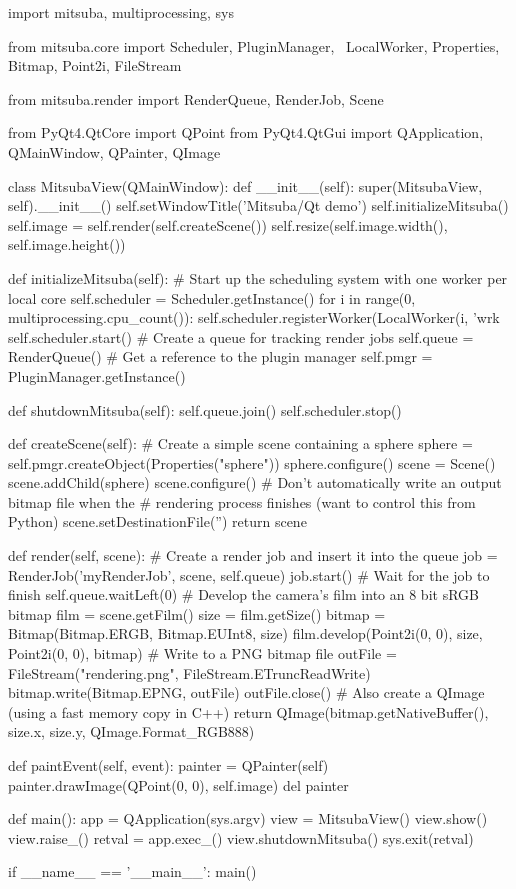\begin{python}
import mitsuba, multiprocessing, sys

from mitsuba.core import Scheduler, PluginManager, \
    LocalWorker, Properties, Bitmap, Point2i, FileStream

from mitsuba.render import RenderQueue, RenderJob, Scene

from PyQt4.QtCore import QPoint
from PyQt4.QtGui import QApplication, QMainWindow, QPainter, QImage

class MitsubaView(QMainWindow):
    def __init__(self):
        super(MitsubaView, self).__init__()
        self.setWindowTitle('Mitsuba/Qt demo')
        self.initializeMitsuba()
        self.image = self.render(self.createScene())
        self.resize(self.image.width(), self.image.height())

    def initializeMitsuba(self):
        # Start up the scheduling system with one worker per local core
        self.scheduler = Scheduler.getInstance()
        for i in range(0, multiprocessing.cpu_count()):
            self.scheduler.registerWorker(LocalWorker(i, 'wrk%
        self.scheduler.start()
        # Create a queue for tracking render jobs
        self.queue = RenderQueue()
        # Get a reference to the plugin manager
        self.pmgr = PluginManager.getInstance()

    def shutdownMitsuba(self):
        self.queue.join()
        self.scheduler.stop()

    def createScene(self):
        # Create a simple scene containing a sphere
        sphere = self.pmgr.createObject(Properties("sphere"))
        sphere.configure()
        scene = Scene()
        scene.addChild(sphere)
        scene.configure()
        # Don't automatically write an output bitmap file when the
        # rendering process finishes (want to control this from Python)
        scene.setDestinationFile('')
        return scene

    def render(self, scene):
        # Create a render job and insert it into the queue
        job = RenderJob('myRenderJob', scene, self.queue)
        job.start()
        # Wait for the job to finish
        self.queue.waitLeft(0)
        # Develop the camera's film into an 8 bit sRGB bitmap
        film = scene.getFilm()
        size = film.getSize()
        bitmap = Bitmap(Bitmap.ERGB, Bitmap.EUInt8, size)
        film.develop(Point2i(0, 0), size, Point2i(0, 0), bitmap)
        # Write to a PNG bitmap file
        outFile = FileStream("rendering.png", FileStream.ETruncReadWrite)
        bitmap.write(Bitmap.EPNG, outFile)
        outFile.close()
        # Also create a QImage (using a fast memory copy in C++)
        return QImage(bitmap.getNativeBuffer(),
            size.x, size.y, QImage.Format_RGB888)

    def paintEvent(self, event):
        painter = QPainter(self)
        painter.drawImage(QPoint(0, 0), self.image)
        del painter

def main():
    app = QApplication(sys.argv)
    view = MitsubaView()
    view.show()
    view.raise_()
    retval = app.exec_()
    view.shutdownMitsuba()
    sys.exit(retval)

if __name__ == '__main__':
    main()
\end{python}

